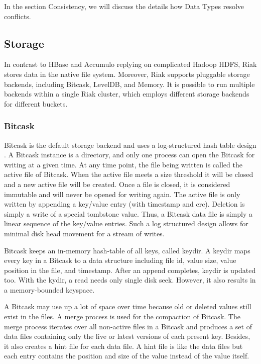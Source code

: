 \documentclass[11pt]{book}
\begin{document}
In the section Consistency, we will discuss the details how Data Types resolve conflicts.

\subsection{Storage}

In contrast to HBase and Accumulo replying on complicated Hadoop HDFS, Riak stores data in the native file system. Moreover, Riak supports pluggable storage backends, including Bitcask, LevelDB, and Memory. It is possible to run multiple backends within a single Riak cluster, which employs different storage backends for different buckets. 

\subsubsection{Bitcask}
Bitcask is the default storage backend and uses a log-structured hash table design \cite{Bitcask}. A Bitcask instance is a directory, and only one process can open the Bitcask for writing at a given time. At any time point, the file being written is called the active file of Bitcask. When the active file meets a size threshold it will be closed and a new active file will be created. Once a file is closed, it is considered immutable and will never be opened for writing again. The active file is only written by appending a key/value entry (with timestamp and crc). Deletion is simply a write of a special tombstone value. Thus, a Bitcask data file is simply a linear sequence of the key/value entries. Such a log structured design allows for minimal disk head movement for a stream of writes.

Bitcask keeps an in-memory hash-table of all keys, called keydir. A keydir maps every key in a Bitcask to a data structure including file id, value size, value position in the file, and timestamp. After an append completes, keydir is updated too.
With the kydir, a read needs only single disk seek. However, it also results in a memory-bounded keyspace.

A Bitcask may use up a lot of space over time because old or deleted values still exist in the files. A merge process is used for the compaction of Bitcask. The merge process iterates over all non-active files in a Bitcask and produces a set of data files containing only the live or latest versions of each present key. Besides, it also creates a hint file for each data file. A hint file is like the data files but each entry contains the position and size of the value instead of the value itself.
\end{document}
